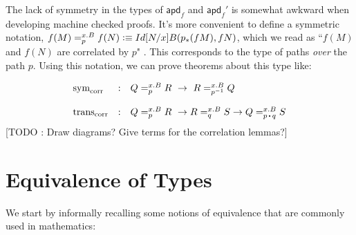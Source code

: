 \documentclass[12pt]{article}
\newcommand{\apd}{\mathsf{apd}}
\begin{document}
The lack of symmetry in the types of $\apd_f$ and $\apd_f'$ is somewhat awkward
when developing machine checked proofs. It's more convenient to define a
symmetric notation, $f(M) =_p^{x. B} f(N) \vcentcolon\equiv Id{[N/x]B}(p_* (f M), f N)$,
which we read as ``$f(M)$ and $f(N)$ are correlated by $p$" . This corresponds
to the type of paths \emph{over} the path $p$. Using this notation, we 
can prove theorems about this type like:


\[
\begin{array}{lcl}
\text{sym}_{\text{corr}} & : & Q =_p^{x.B} R \ \to \ R =_{p^{-1}}^{x.B} Q \\
\\
\text{trans}_{\text{corr}} & : & Q =_p^{x.B} R \ \to R =_q^{x.B} S \to Q =_{p \concat q}^{x.B} S 
\end{array}
\]
%
[TODO : Draw diagrams? Give terms for the correlation lemmas?]

\section{Equivalence of Types}

We start by informally recalling some notions of equivalence that are commonly
used in mathematics:
\end{document}
